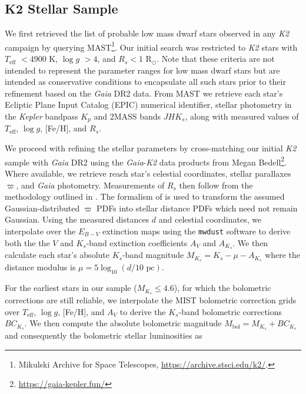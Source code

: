 \documentclass[twocolumn]{emulateapj}
\newcommand{\gaia}[1]{\emph{Gaia}#1}
\newcommand{\kepler}[1]{\emph{Kepler}#1}
\newcommand{\ktwo}[1]{\emph{K2}#1}
\newcommand{\teff}[1]{$T_{\text{eff}}$#1}
\newcommand{\logg}[1]{$\log{g}$#1}
\begin{document}
\subsection{K2 Stellar Sample}
We first retrieved the list of probable low mass dwarf stars observed in any \ktwo{} campaign by querying
MAST\footnote{Mikulski Archive for Space Telescopes, \url{https://archive.stsci.edu/k2/}.}. Our initial
search was restricted to \ktwo{} stars with \teff{} $<4900$ K, \logg{} $>4$, and $R_s<1$ R$_{\odot}$. Note that these
criteria are not intended to represent the parameter ranges for low mass dwarf stars but are intended as
conservative conditions to encapsulate all such stars prior to their refinement based on the \gaia{} DR2
data. %
From MAST we retrieve each star's Ecliptic Plane Input Catalog
(EPIC) numerical identifier, stellar photometry in the \kepler{} bandpass $K_p$ and 2MASS bands $JHK_s$, along
with measured values of \teff{,} \logg{,} [Fe/H], and $R_s$.%

We proceed with refining the stellar parameters by cross-matching our initial \ktwo{} sample with \gaia{}  
DR2 using the \gaia{-}\ktwo{} data products from Megan Bedell\footnote{\url{https://gaia-kepler.fun/}}. Where
available, we retrieve reach star's celestial coordinates, stellar parallaxes $\varpi$, and \gaia{} photometry.
Measurements of $R_s$ then follow from the methodology
outlined in \cite{berger18}. The formalism of \cite{bailerjones18} is used to transform the assumed
Gaussian-distributed $\varpi$ PDFs into stellar distance PDFs which need not remain Gaussian.
Using the measured distances $d$ and celestial coordinates, we interpolate over the $E_{B-V}$ extinction maps using the
\texttt{mwdust} software \citep{bovy16} to derive both the the $V$ and $K_s$-band extinction coefficients $A_V$ and
$A_{K_s}$. We then calculate each star's absolute $K_s$-band magnitude $M_{K_s} = K_s - \mu - A_{K_s}$ where
the distance modulus is $\mu = 5\log_{10}(d/10\text{ pc})$.

For the earliest stars in our sample ($M_{K_s}\leq 4.6$), for which the bolometric corrections
are still reliable, we interpolate the MIST bolometric correction grids \citep{choi16} over \teff{,} \logg{,} [Fe/H],
and $A_V$ to derive the $K_s$-band bolometric corrections $BC_{K_s}$. We then compute the
absolute bolometric magnitude $M_{\text{bol}}=M_{K_s} + BC_{K_s}$ and consequently the bolometric stellar
luminosities as 
\end{document}
